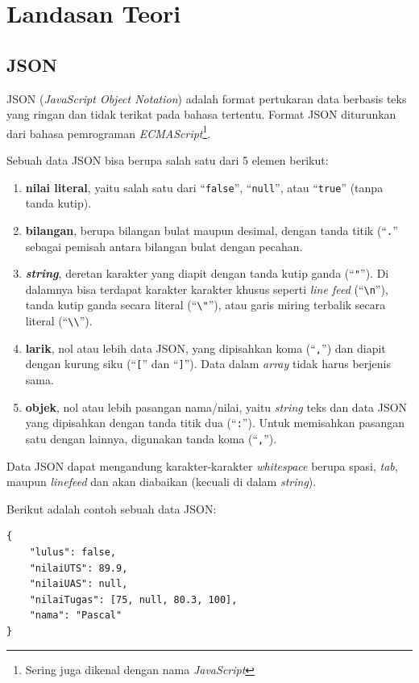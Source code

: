 \chapter{Landasan Teori}

\section{JSON}

JSON (\textit{JavaScript Object Notation}) adalah format pertukaran data berbasis teks yang ringan dan tidak terikat pada bahasa tertentu\cite{rfc7159}. Format JSON diturunkan dari bahasa pemrograman \textit{ECMAScript}\footnote{Sering juga dikenal dengan nama \textit{JavaScript}}.

Sebuah data JSON bisa berupa salah satu dari 5 elemen berikut:

\begin{enumerate}
	\item \textbf{nilai literal}, yaitu salah satu dari ``\texttt{false}'', ``\texttt{null}'', atau ``\texttt{true}'' (tanpa tanda kutip).
	\item \textbf{bilangan}, berupa bilangan bulat maupun desimal, dengan tanda titik (``\texttt{.}'' sebagai pemisah antara bilangan bulat dengan pecahan.
	\item \textbf{\textit{string}}, deretan karakter yang diapit dengan tanda kutip ganda (``\verb/"/''). Di dalamnya bisa terdapat karakter karakter khusus seperti \textit{line feed} (``\verb/\n/''), tanda kutip ganda secara literal (``\verb/\"/''), atau garis miring terbalik secara literal (``\verb/\\/'').
	\item \textbf{larik}, nol atau lebih data JSON, yang dipisahkan koma (``\verb/,/'') dan diapit dengan kurung siku (``\verb/[/'' dan ``\verb/]/''). Data dalam \textit{array} tidak harus berjenis sama.
	\item \textbf{objek}, nol atau lebih pasangan nama/nilai, yaitu \textit{string} teks dan data JSON yang dipisahkan dengan tanda titik dua (``\verb/:/''). Untuk memisahkan pasangan satu dengan lainnya, digunakan tanda koma (``\verb/,/'').
\end{enumerate}

Data JSON dapat mengandung karakter-karakter \textit{whitespace} berupa spasi, \textit{tab}, maupun \textit{linefeed} dan akan diabaikan (kecuali di dalam \textit{string}).

Berikut adalah contoh sebuah data JSON:

\begin{lstlisting}
{
	"lulus": false,
	"nilaiUTS": 89.9,
	"nilaiUAS": null,
	"nilaiTugas": [75, null, 80.3, 100],
	"nama": "Pascal"
}
\end{lstlisting}

